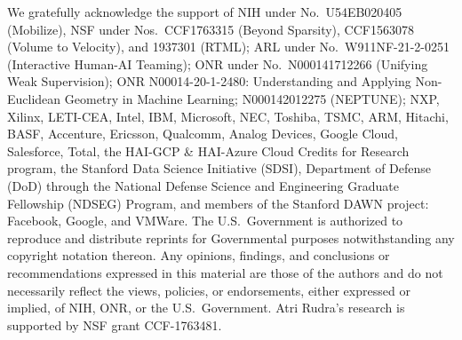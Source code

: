 \documentclass{article}
\begin{document}
We gratefully acknowledge the support of NIH under No.\ U54EB020405 (Mobilize), NSF under Nos.\ CCF1763315 (Beyond Sparsity), CCF1563078 (Volume to Velocity), and 1937301 (RTML); ARL under No.\ W911NF-21-2-0251 (Interactive Human-AI Teaming); ONR under No.\ N000141712266 (Unifying Weak Supervision); ONR N00014-20-1-2480: Understanding and Applying Non-Euclidean Geometry in Machine Learning; N000142012275 (NEPTUNE); NXP, Xilinx, LETI-CEA, Intel, IBM, Microsoft, NEC, Toshiba, TSMC, ARM, Hitachi, BASF, Accenture, Ericsson, Qualcomm, Analog Devices, Google Cloud, Salesforce, Total, the HAI-GCP \& HAI-Azure Cloud Credits for Research program,  the Stanford Data Science Initiative (SDSI), Department of Defense (DoD) through the National Defense Science and Engineering Graduate Fellowship (NDSEG) Program, and members of the Stanford DAWN project: Facebook, Google, and VMWare. The U.S.\ Government is authorized to reproduce and distribute reprints for Governmental purposes notwithstanding any copyright notation thereon. Any opinions, findings, and conclusions or recommendations expressed in this material are those of the authors and do not necessarily reflect the views, policies, or endorsements, either expressed or implied, of NIH, ONR, or the U.S.\ Government.
Atri Rudra’s research is supported by NSF grant CCF-1763481.




\newpage

\appendix
\end{document}
